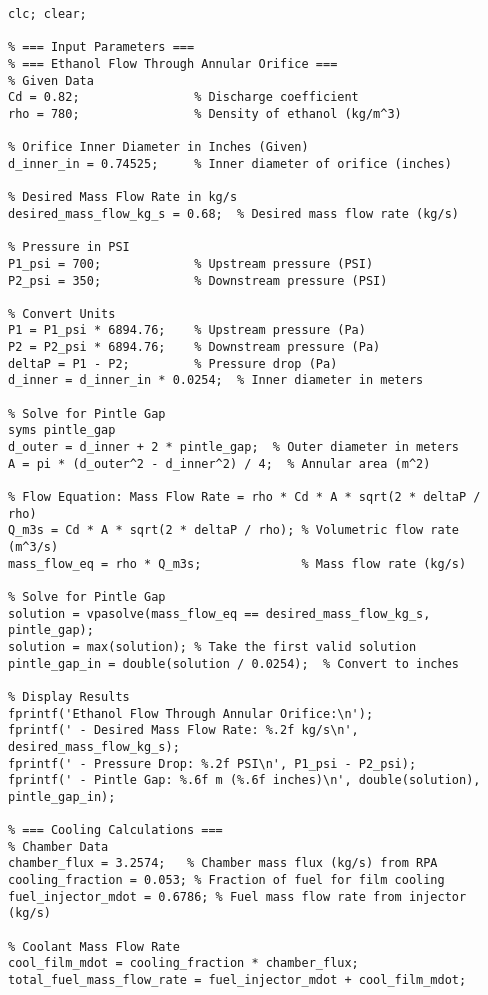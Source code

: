 \begin{verbatim}
clc; clear;

% === Input Parameters ===
% === Ethanol Flow Through Annular Orifice ===
% Given Data
Cd = 0.82;                % Discharge coefficient
rho = 780;                % Density of ethanol (kg/m^3)

% Orifice Inner Diameter in Inches (Given)
d_inner_in = 0.74525;     % Inner diameter of orifice (inches)

% Desired Mass Flow Rate in kg/s
desired_mass_flow_kg_s = 0.68;  % Desired mass flow rate (kg/s)

% Pressure in PSI
P1_psi = 700;             % Upstream pressure (PSI)
P2_psi = 350;             % Downstream pressure (PSI)

% Convert Units
P1 = P1_psi * 6894.76;    % Upstream pressure (Pa)
P2 = P2_psi * 6894.76;    % Downstream pressure (Pa)
deltaP = P1 - P2;         % Pressure drop (Pa)
d_inner = d_inner_in * 0.0254;  % Inner diameter in meters

% Solve for Pintle Gap
syms pintle_gap
d_outer = d_inner + 2 * pintle_gap;  % Outer diameter in meters
A = pi * (d_outer^2 - d_inner^2) / 4;  % Annular area (m^2)

% Flow Equation: Mass Flow Rate = rho * Cd * A * sqrt(2 * deltaP / rho)
Q_m3s = Cd * A * sqrt(2 * deltaP / rho); % Volumetric flow rate (m^3/s)
mass_flow_eq = rho * Q_m3s;              % Mass flow rate (kg/s)

% Solve for Pintle Gap
solution = vpasolve(mass_flow_eq == desired_mass_flow_kg_s, pintle_gap);
solution = max(solution); % Take the first valid solution
pintle_gap_in = double(solution / 0.0254);  % Convert to inches

% Display Results
fprintf('Ethanol Flow Through Annular Orifice:\n');
fprintf(' - Desired Mass Flow Rate: %.2f kg/s\n', desired_mass_flow_kg_s);
fprintf(' - Pressure Drop: %.2f PSI\n', P1_psi - P2_psi);
fprintf(' - Pintle Gap: %.6f m (%.6f inches)\n', double(solution), pintle_gap_in);

% === Cooling Calculations ===
% Chamber Data
chamber_flux = 3.2574;   % Chamber mass flux (kg/s) from RPA
cooling_fraction = 0.053; % Fraction of fuel for film cooling
fuel_injector_mdot = 0.6786; % Fuel mass flow rate from injector (kg/s)

% Coolant Mass Flow Rate
cool_film_mdot = cooling_fraction * chamber_flux;  
total_fuel_mass_flow_rate = fuel_injector_mdot + cool_film_mdot;  


\end{verbatim}

